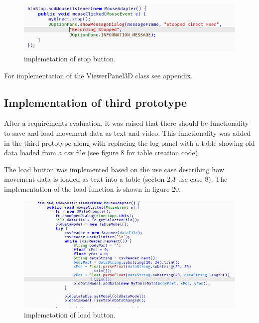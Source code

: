 \documentclass[a4paper, 12pt]{article}
\begin{document}
\begin{figure}[!htb]
	\begin{center}
  \includegraphics[scale=0.7]{codesnippet16.png}
  	\caption{implemetation of stop button.}
  \end{center} 
  \label{fig: codesnippet15} 
\end{figure}

For implementation of the ViewerPanel3D class see appendix.

\subsection{Implementation of third prototype}

After a requirements evaluation, it was raised that there should be functionality to save and load movement data as text and video. This functionality was added in the third prototype along with replacing the log panel with a table showing old data loaded from a csv file  (see figure 8 for table creation code).

The load button was implemented based on the use case describing how movement data is loaded as text into a table (secton 2.3 use case 8). The implementation of the load function is shown in figure 20. 

\begin{figure}[!htb]
	\begin{center}
  \includegraphics[scale=0.8]{codesnippet18.png}
  	\caption{implemetation of load button.}
  \end{center} 
  \label{fig: codesnippet17} 
\end{figure}
\end{document}
